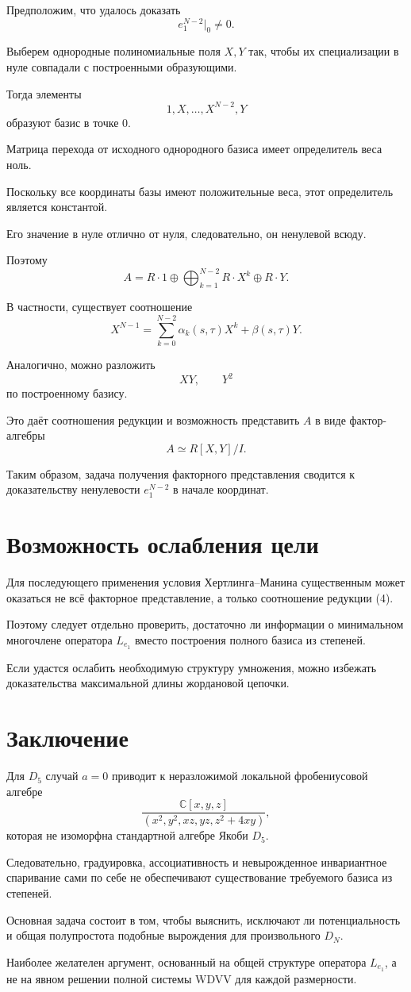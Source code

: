 Предположим, что удалось доказать
\[
e_1^{N-2}\big|_0\neq0.
\]

Выберем однородные полиномиальные поля
$X,Y$ так, чтобы их специализации в нуле
совпадали с построенными образующими.

Тогда элементы
\[
1,X,\ldots,X^{N-2},Y
\]
образуют базис в точке $0$.

Матрица перехода от исходного
однородного базиса имеет определитель
веса ноль.

Поскольку все координаты базы имеют
положительные веса, этот определитель
является константой.

Его значение в нуле отлично от нуля,
следовательно, он ненулевой всюду.

Поэтому
\[
\boxed{
	A=
	R\cdot 1\oplus
	\bigoplus_{k=1}^{N-2}R\cdot X^k
	\oplus R\cdot Y.
}
\]

В частности, существует соотношение
\[
\boxed{
	X^{N-1}
	=
	\sum_{k=0}^{N-2}
	\alpha_k(s,\tau)X^k
	+\beta(s,\tau)Y.
}
\tag{4}
\]

Аналогично, можно разложить
\[
XY,\qquad Y^2
\]
по построенному базису.

Это даёт соотношения редукции
и возможность представить $A$
в виде фактор-алгебры
\[
A\simeq R[X,Y]/I.
\]

Таким образом, задача получения
факторного представления сводится
к доказательству ненулевости
$e_1^{N-2}$ в начале координат.

\section{Возможность ослабления цели}

Для последующего применения условия
Хертлинга--Манина существенным может
оказаться не всё факторное представление,
а только соотношение редукции (4).

Поэтому следует отдельно проверить,
достаточно ли информации о минимальном
многочлене оператора $L_{e_1}$ вместо
построения полного базиса из степеней.

Если удастся ослабить необходимую
структуру умножения, можно избежать
доказательства максимальной длины
жордановой цепочки.

\section{Заключение}

Для $D_5$ случай $a=0$ приводит к
неразложимой локальной фробениусовой
алгебре
\[
\frac{\mathbb C[x,y,z]}
{(x^2,y^2,xz,yz,z^2+4xy)},
\]
которая не изоморфна стандартной
алгебре Якоби $D_5$.

Следовательно, градуировка,
ассоциативность и невырожденное
инвариантное спаривание сами по себе
не обеспечивают существование
требуемого базиса из степеней.

Основная задача состоит в том, чтобы
выяснить, исключают ли потенциальность
и общая полупростота подобные
вырождения для произвольного $D_N$.

Наиболее желателен аргумент,
основанный на общей структуре
оператора $L_{e_1}$, а не на
явном решении полной системы WDVV
для каждой размерности.\fi